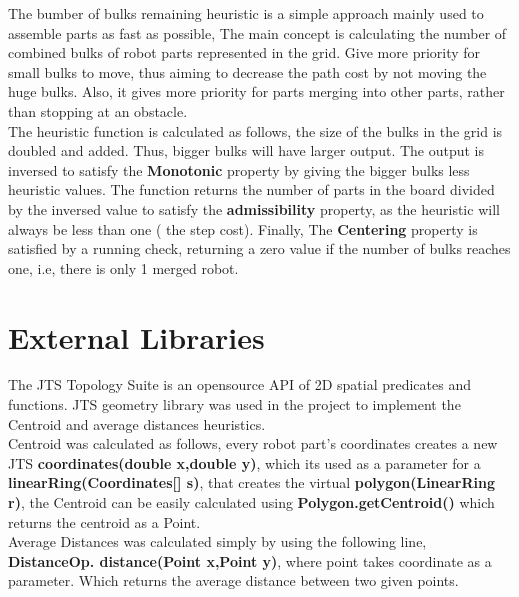 The bumber of bulks remaining heuristic is a simple approach mainly used to assemble parts as fast as possible, The main concept is calculating the number of combined bulks of robot parts represented in the grid. Give more priority for small bulks to move, thus aiming to decrease the path cost by not moving the huge bulks. Also, it gives more priority for parts merging into other parts, rather than stopping at an obstacle.  \\

The heuristic function is calculated as follows, the size of the bulks in the grid is doubled and added. Thus, bigger bulks will have larger output. The output is inversed to satisfy the \textbf{Monotonic} property by giving the bigger bulks less heuristic values. The function returns the number of parts in the board divided by the inversed value to satisfy the \textbf{admissibility} property, as the heuristic will always be less than one ( the step cost). Finally, The \textbf{Centering} property is satisfied by a running check, returning a zero value if the number of bulks reaches one, i.e, there is only 1 merged robot.


\chapter{External Libraries}

The JTS Topology Suite is an opensource API of 2D spatial predicates and functions. JTS geometry library was used in the project to implement the Centroid and average distances heuristics. \\

 Centroid was calculated as follows, every robot part's coordinates creates a new JTS \textbf{coordinates(double x,double y)}, which its used as a parameter for a \textbf{linearRing(Coordinates[] s)}, that creates the virtual \textbf{polygon(LinearRing r)}, the Centroid can be easily calculated using \textbf{Polygon.getCentroid()} which returns the centroid as a Point.\\
 
 Average Distances was calculated simply by using the following line, \textbf{DistanceOp. distance(Point x,Point y)}, where point takes coordinate as a parameter. Which returns the average distance between two given points.
 \\
 
 
 